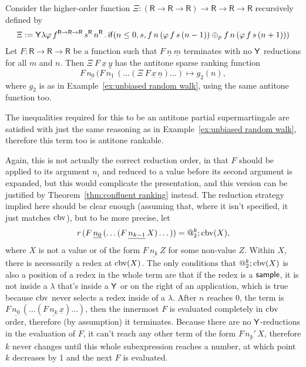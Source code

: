 \begin{example}
\label{ex:higher-order recursion}
Consider the higher-order function
$\Xi : (\textsf{R} \to \textsf{R} \to \textsf{R}) \to \textsf{R} \to \textsf{R} \to \textsf{R}$
recursively defined by
\[
\Xi := \mathsf{Y} \lambda \varphi \, f^{\textsf{R} \to \textsf{R} \to \textsf{R}} \, s^\textsf{R} \, n^\textsf{R} \, . \, 
\mathsf{if}(n \leq 0, s, 
f \, n \, (\varphi \, f \, s \, (n - 1))
\oplus_p
f \, n \, (\varphi \, f \, s \, (n + 1))
)
\]
Let $F : \textsf{R} \to \textsf{R} \to \textsf{R}$ be a function such that $F\ \underline n\ \underline m$ terminates with no $\mathsf{Y}$ reductions for all $m$ and $n$. Then $\Xi\ F\ \underline x\ \underline y$ has the antitone sparse ranking function 
\[
F \, \underline{n_0} \, (F \, \underline{n_1} \, (\dots(\Xi\ F\, \underline x\, \underline n)\dots) \mapsto g_2(n),
\] 
where $g_2$ is as in Example~\ref{ex:unbiased random walk}, using the same antitone function too.

The inequalities required for this to be an antitone partial supermartingale are satisfied with just the same reasoning as in Example~\ref{ex:unbiased random walk}, therefore this term too is antitone rankable.

Again, this is not actually the correct reduction order, in that $F$ should be applied to its argument $n_i$ and reduced to a value before its second argument is expanded, 
but this would complicate the presentation, and this version can be justified by Theorem~\ref{thm:confluent ranking} instead. 
The reduction strategy implied here should be clear enough (assuming that, where it isn't specified, it just matches $\operatorname{cbv}$), but to be more precise, 
let 
\[
r \, (F \, \underline{n_0} \, (\dots(F\, \underline {n_{k-1}}\, X)\dots)) = @_2^k;\operatorname{cbv}(X),
\] 
where $X$ is not a value or of the form $F\ \underline{n_k}\ Z$ for some non-value $Z$. 
Within $X$, there is necessarily a redex at $\operatorname{cbv}(X)$. 
The only conditions that $@_2^k;\operatorname{cbv}(X)$ is also a position of a redex in the whole term are that if the redex is a $\mathsf{sample}$, 
it is not inside a $\lambda$ that's inside a $\mathsf{Y}$ or on the right of an application, which is true because $\operatorname{cbv}$ never selects a redex inside of a $\lambda$. 
After $n$ reaches $0$, the term is $F \, \underline{n_0} \, (\dots(F\, \underline {n_k} \, \underline x)\dots)$, then the innermost $F$ is evaluated completely in $\operatorname{cbv}$ order, therefore (by assumption) it terminates. 
Because there are no $\mathsf{Y}$-reductions in the evaluation of $F$, it can't reach any other term of the form $F\, \underline{n_k'}\, X$, 
therefore $k$ never changes until this whole subexpression reaches a number, at which point $k$ decreases by 1 and the next $F$ is evaluated.
\end{example}

